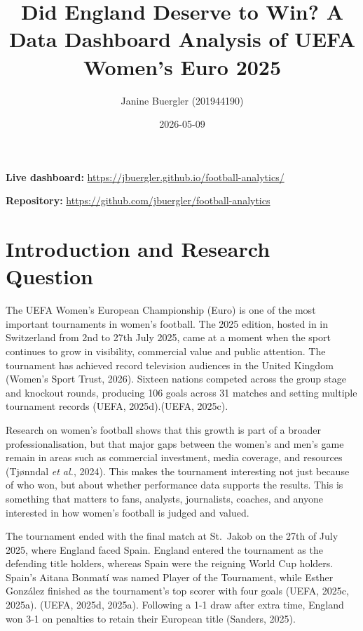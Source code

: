 \documentclass[
  11pt,
  a4paper,
  DIV=11,
  numbers=noendperiod]{scrartcl}
\title{Did England Deserve to Win? A Data Dashboard Analysis of UEFA
Women's Euro 2025}
\author{Janine Buergler (201944190)}
\date{2026-05-09}
\renewcommand*\contentsname{Table of contents}
\newcommand\contentsname{Table of contents}
\begin{document}
\maketitle

\renewcommand*\contentsname{Table of contents}
{
\hypersetup{linkcolor=}
\setcounter{tocdepth}{3}
\tableofcontents
}
\listoffigures
\listoftables

\textbf{Live dashboard:}
\url{https://jbuergler.github.io/football-analytics/}

\textbf{Repository:}
\url{https://github.com/jbuergler/football-analytics}

\newpage{}

\section{Introduction and Research
Question}\label{introduction-and-research-question}

The UEFA Women's European Championship (Euro) is one of the most
important tournaments in women's football. The 2025 edition, hosted in
in Switzerland from 2nd to 27th July 2025, came at a moment when the
sport continues to grow in visibility, commercial value and public
attention. The tournament has achieved record television audiences in
the United Kingdom (Women's Sport Trust, 2026). Sixteen nations competed
across the group stage and knockout rounds, producing 106 goals across
31 matches and setting multiple tournament records (UEFA, 2025d).(UEFA,
2025c).

Research on women's football shows that this growth is part of a broader
professionalisation, but that major gaps between the women's and men's
game remain in areas such as commercial investment, media coverage, and
resources (Tjønndal \emph{et al.}, 2024). This makes the tournament
interesting not just because of who won, but about whether performance
data supports the results. This is something that matters to fans,
analysts, journalists, coaches, and anyone interested in how women's
football is judged and valued.

The tournament ended with the final match at St.~Jakob on the 27th of
July 2025, where England faced Spain. England entered the tournament as
the defending title holders, whereas Spain were the reigning World Cup
holders. Spain's Aitana Bonmatí was named Player of the Tournament,
while Esther González finished as the tournament's top scorer with four
goals (UEFA, 2025c, 2025a). (UEFA, 2025d, 2025a). Following a 1-1 draw
after extra time, England won 3-1 on penalties to retain their European
title (Sanders, 2025).
\end{document}
